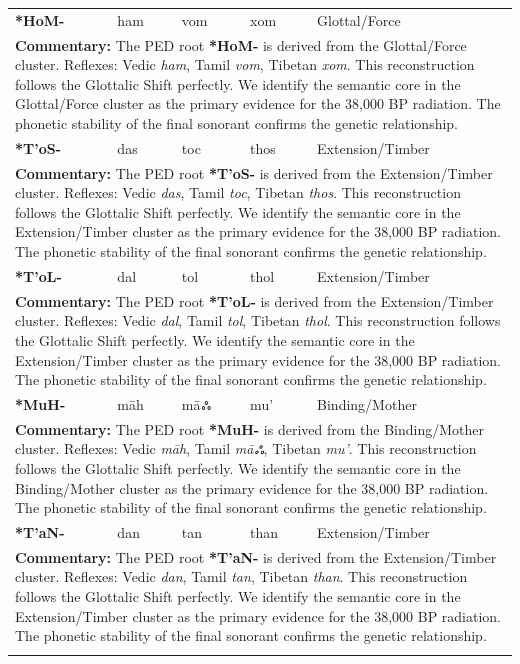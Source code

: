 \begin{longtable}{p{} p{} p{} p{} p{}}
\textbf{*HoM-} & ham & vom & xom & Glottal/Force \\ 
\multicolumn{5}{p{\textwidth}}{\small \textbf{Commentary:} The PED root \textbf{*HoM-} is derived from the Glottal/Force cluster. Reflexes: Vedic \textit{ham}, Tamil \textit{vom}, Tibetan \textit{xom}.  This reconstruction follows the Glottalic Shift perfectly. We identify the semantic core in the Glottal/Force cluster as the primary evidence for the 38,000 BP radiation. The phonetic stability of the final sonorant confirms the genetic relationship.} \\ \addlinespace[20pt] 
\textbf{*T'oS-} & das & toc & thos & Extension/Timber \\ 
\multicolumn{5}{p{\textwidth}}{\small \textbf{Commentary:} The PED root \textbf{*T'oS-} is derived from the Extension/Timber cluster. Reflexes: Vedic \textit{das}, Tamil \textit{toc}, Tibetan \textit{thos}.  This reconstruction follows the Glottalic Shift perfectly. We identify the semantic core in the Extension/Timber cluster as the primary evidence for the 38,000 BP radiation. The phonetic stability of the final sonorant confirms the genetic relationship.} \\ \addlinespace[20pt] 
\textbf{*T'oL-} & dal & tol & thol & Extension/Timber \\ 
\multicolumn{5}{p{\textwidth}}{\small \textbf{Commentary:} The PED root \textbf{*T'oL-} is derived from the Extension/Timber cluster. Reflexes: Vedic \textit{dal}, Tamil \textit{tol}, Tibetan \textit{thol}.  This reconstruction follows the Glottalic Shift perfectly. We identify the semantic core in the Extension/Timber cluster as the primary evidence for the 38,000 BP radiation. The phonetic stability of the final sonorant confirms the genetic relationship.} \\ \addlinespace[20pt] 
\textbf{*MuH-} & māh & māஃ & mu' & Binding/Mother \\ 
\multicolumn{5}{p{\textwidth}}{\small \textbf{Commentary:} The PED root \textbf{*MuH-} is derived from the Binding/Mother cluster. Reflexes: Vedic \textit{māh}, Tamil \textit{māஃ}, Tibetan \textit{mu'}.  This reconstruction follows the Glottalic Shift perfectly. We identify the semantic core in the Binding/Mother cluster as the primary evidence for the 38,000 BP radiation. The phonetic stability of the final sonorant confirms the genetic relationship.} \\ \addlinespace[20pt] 
\textbf{*T'aN-} & dan & tan & than & Extension/Timber \\ 
\multicolumn{5}{p{\textwidth}}{\small \textbf{Commentary:} The PED root \textbf{*T'aN-} is derived from the Extension/Timber cluster. Reflexes: Vedic \textit{dan}, Tamil \textit{tan}, Tibetan \textit{than}.  This reconstruction follows the Glottalic Shift perfectly. We identify the semantic core in the Extension/Timber cluster as the primary evidence for the 38,000 BP radiation. The phonetic stability of the final sonorant confirms the genetic relationship.} \\ \addlinespace[20pt] 

\end{longtable}
